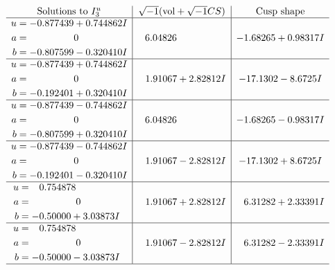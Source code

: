 \documentclass[1p]{elsarticle_modified}
\theoremstyle{definition}
\newcommand{\I}{\sqrt{-1}}
\begin{document}
$$\begin{array}{c|c|c}  
\text{Solutions to }I^u_{3}& \I (\text{vol} + \sqrt{-1}CS) & \text{Cusp shape}\\
 \hline 
\begin{aligned}
u &= -0.877439 + 0.744862 I \\
a &= \phantom{-0.000000 } 0 \\
b &= -0.807599 - 0.320410 I\end{aligned}
 & \phantom{-}6.04826\phantom{ +0.000000I} & -1.68265 + 0.98317 I \\ \hline\begin{aligned}
u &= -0.877439 + 0.744862 I \\
a &= \phantom{-0.000000 } 0 \\
b &= -0.192401 + 0.320410 I\end{aligned}
 & \phantom{-}1.91067 + 2.82812 I & -17.1302 - 8.6725 I \\ \hline\begin{aligned}
u &= -0.877439 - 0.744862 I \\
a &= \phantom{-0.000000 } 0 \\
b &= -0.807599 + 0.320410 I\end{aligned}
 & \phantom{-}6.04826\phantom{ +0.000000I} & -1.68265 - 0.98317 I \\ \hline\begin{aligned}
u &= -0.877439 - 0.744862 I \\
a &= \phantom{-0.000000 } 0 \\
b &= -0.192401 - 0.320410 I\end{aligned}
 & \phantom{-}1.91067 - 2.82812 I & -17.1302 + 8.6725 I \\ \hline\begin{aligned}
u &= \phantom{-}0.754878\phantom{ +0.000000I} \\
a &= \phantom{-0.000000 } 0 \\
b &= -0.50000 + 3.03873 I\end{aligned}
 & \phantom{-}1.91067 + 2.82812 I & \phantom{-}6.31282 + 2.33391 I \\ \hline\begin{aligned}
u &= \phantom{-}0.754878\phantom{ +0.000000I} \\
a &= \phantom{-0.000000 } 0 \\
b &= -0.50000 - 3.03873 I\end{aligned}
 & \phantom{-}1.91067 - 2.82812 I & \phantom{-}6.31282 - 2.33391 I\\
 \hline 
 \end{array}$$\newpage\newpage\renewcommand{\arraystretch}{1}
\end{document}
